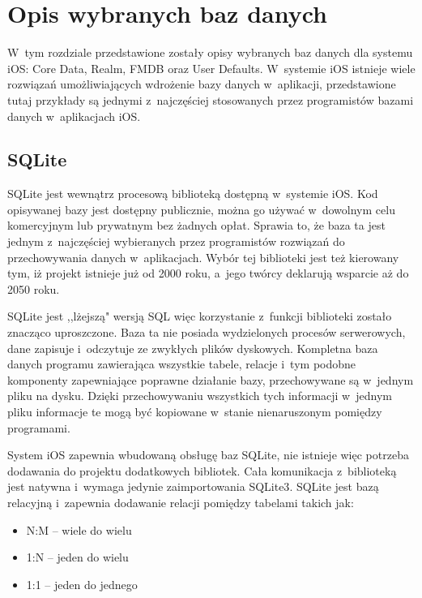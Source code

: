 \section{Opis wybranych baz danych}

 W~tym rozdziale przedstawione zostały opisy wybranych baz danych dla systemu iOS: Core Data, Realm, FMDB oraz User Defaults. W~systemie iOS istnieje wiele rozwiązań umożliwiających wdrożenie bazy danych w~aplikacji, przedstawione tutaj przykłady są jednymi z~najczęściej stosowanych przez programistów bazami danych w~aplikacjach iOS.

\subsection{SQLite}
SQLite jest wewnątrz procesową biblioteką dostępną w~systemie iOS. Kod opisywanej bazy jest dostępny publicznie, można go używać w~dowolnym celu komercyjnym lub prywatnym bez żadnych opłat. Sprawia to, że baza ta jest jednym z~najczęściej wybieranych przez programistów rozwiązań do przechowywania danych w~aplikacjach. Wybór tej biblioteki jest też kierowany tym, iż projekt istnieje już od 2000 roku, a~jego twórcy deklarują wsparcie aż do 2050 roku\cite{SQLite-doc}.\par

SQLite jest ,,lżejszą" wersją SQL więc korzystanie z~funkcji biblioteki zostało znacząco uproszczone. Baza ta nie posiada wydzielonych procesów serwerowych, dane zapisuje i~odczytuje ze zwykłych plików dyskowych. Kompletna baza danych programu zawierająca wszystkie tabele, relacje i~tym podobne komponenty zapewniające poprawne działanie bazy, przechowywane są w~jednym pliku na dysku. Dzięki przechowywaniu wszystkich tych informacji w~jednym pliku informacje te mogą być kopiowane w~stanie nienaruszonym pomiędzy programami.\par

System iOS zapewnia wbudowaną obsługę baz SQLite, nie istnieje więc potrzeba dodawania do projektu dodatkowych bibliotek. Cała komunikacja z~biblioteką jest natywna i~wymaga jedynie zaimportowania SQLite3\cite{SQLite-doc}. 
SQLite jest bazą relacyjną i~zapewnia dodawanie relacji pomiędzy tabelami takich jak: 

\begin{itemize}
  \item N:M – wiele do wielu
  \item 1:N – jeden do wielu
  \item 1:1 – jeden do jednego 
\end{itemize}

